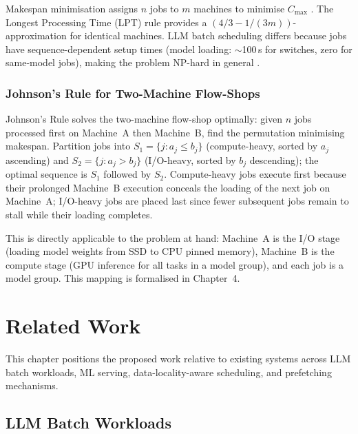 \documentclass[logo,bsc,singlespacing,parskip,online]{infthesis}
\begin{document}
Makespan minimisation assigns $n$ jobs to $m$ machines to minimise $C_{\max}$ \citep{pinedo2016scheduling}. The Longest Processing Time (LPT) rule \citep{graham1966bounds} provides a $(4/3 - 1/(3m))$-approximation for identical machines. LLM batch scheduling differs because jobs have sequence-dependent setup times (model loading: $\sim$100\,s for switches, zero for same-model jobs), making the problem NP-hard in general \citep{pinedo2016scheduling}.

\subsection{Johnson's Rule for Two-Machine Flow-Shops}
\label{sec:bg_johnsons_rule}

Johnson's Rule \citep{pinedo2016scheduling} solves the two-machine flow-shop optimally: given $n$ jobs processed first on Machine~A then Machine~B, find the permutation minimising makespan. Partition jobs into $S_1 = \{j : a_j \leq b_j\}$ (compute-heavy, sorted by $a_j$ ascending) and $S_2 = \{j : a_j > b_j\}$ (I/O-heavy, sorted by $b_j$ descending); the optimal sequence is $S_1$ followed by $S_2$. Compute-heavy jobs execute first because their prolonged Machine~B execution conceals the loading of the next job on Machine~A; I/O-heavy jobs are placed last since fewer subsequent jobs remain to stall while their loading completes.

This is directly applicable to the problem at hand: Machine~A is the I/O stage (loading model weights from SSD to CPU pinned memory), Machine~B is the compute stage (GPU inference for all tasks in a model group), and each job is a model group. This mapping is formalised in Chapter~4.



\chapter{Related Work}

This chapter positions the proposed work relative to existing systems across LLM batch workloads, ML serving, data-locality-aware scheduling, and prefetching mechanisms.

\section{LLM Batch Workloads}
\end{document}
